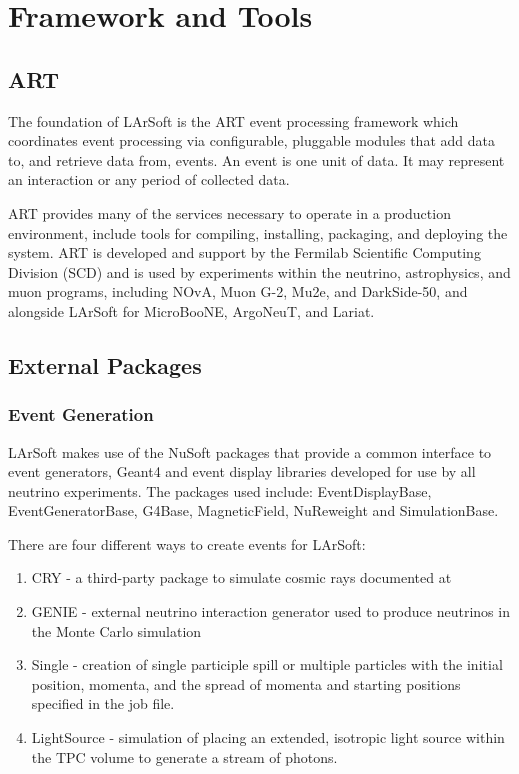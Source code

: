 \documentclass[12pt]{elsarticle}
\begin{document}
\section{Framework and Tools}
\subsection{ART}
The foundation of LArSoft is the ART event processing framework which coordinates event processing via configurable, pluggable modules that add data to, and retrieve data from, events.\cite{art-ref}  An event is one unit of data. It may represent an interaction or any period of collected data.

ART provides many of the services necessary to operate in a production environment, include tools for compiling, installing, packaging, and deploying the system.  ART is developed and support by the Fermilab Scientific Computing Division (SCD) and is used by experiments within the neutrino, astrophysics, and muon programs, including NOvA, Muon G-2, Mu2e, and DarkSide-50, and alongside LArSoft for MicroBooNE, ArgoNeuT, and Lariat.

\subsection{External Packages}
\subsubsection{Event Generation}
LArSoft makes use of the NuSoft packages that provide a common interface to event generators, Geant4 and event display libraries developed for use by all neutrino experiments. The packages used include:    EventDisplayBase, EventGeneratorBase, G4Base, MagneticField, NuReweight and SimulationBase.

There are four different ways to create events for LArSoft:
\begin{enumerate}
\item{CRY - a third-party package to simulate cosmic rays documented at \cite{cry}}
\item{GENIE - external neutrino interaction generator used to produce neutrinos in the Monte Carlo simulation}
\item{Single - creation of single participle spill or multiple particles with the initial position, momenta, and the spread of momenta and starting positions specified in the job file.}
\item{LightSource - simulation of placing an extended, isotropic light source within the TPC volume to generate a stream of photons.}
\end{enumerate}
\end{document}
